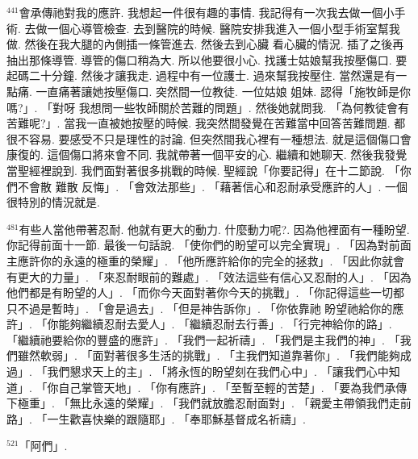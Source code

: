 \documentclass{book}
\begin{document}
$^{441}$會承傳祂對我的應許.
我想起一件很有趣的事情.
我記得有一次我去做一個小手術.
去做一個心導管檢查.
去到醫院的時候.
醫院安排我進入一個小型手術室幫我做.
然後在我大腿的內側插一條管進去.
然後去到心臟 看心臟的情況.
插了之後再抽出那條導管.
導管的傷口稍為大.
所以他要很小心.
找護士姑娘幫我按壓傷口.
要起碼二十分鐘.
然後才讓我走.
過程中有一位護士.
過來幫我按壓住.
當然還是有一點痛.
一直痛著讓她按壓傷口.
突然間一位教徒.
一位姑娘 姐妹.
認得「施牧師是你嗎?」.
「對呀 我想問一些牧師關於苦難的問題」.
然後她就問我.
「為何教徒會有苦難呢?」.
當我一直被她按壓的時候.
我突然間發覺在苦難當中回答苦難問題.
都很不容易.
要感受不只是理性的討論.
但突然間我心裡有一種想法.
就是這個傷口會康復的.
這個傷口將來會不同.
我就帶著一個平安的心.
繼續和她聊天.
然後我發覺當聖經裡說到.
我們面對著很多挑戰的時候.
聖經說「你要記得」在十二節說.
「你們不會散 難散 反悔」.
「會效法那些」.
「藉著信心和忍耐承受應許的人」.
一個很特別的情況就是.

$^{481}$有些人當他帶著忍耐.
他就有更大的動力.
什麼動力呢?.
因為他裡面有一種盼望.
你記得前面十一節.
最後一句話說.
「使你們的盼望可以完全實現」.
「因為對前面主應許你的永遠的極重的榮耀」.
「他所應許給你的完全的拯救」.
「因此你就會有更大的力量」.
「來忍耐眼前的難處」.
「效法這些有信心又忍耐的人」.
「因為他們都是有盼望的人」.
「而你今天面對著你今天的挑戰」.
「你記得這些一切都只不過是暫時」.
「會是過去」.
「但是神告訴你」.
「你依靠祂 盼望祂給你的應許」.
「你能夠繼續忍耐去愛人」.
「繼續忍耐去行善」.
「行完神給你的路」.
「繼續祂要給你的豐盛的應許」.
「我們一起祈禱」.
「我們是主我們的神」.
「我們雖然軟弱」.
「面對著很多生活的挑戰」.
「主我們知道靠著你」.
「我們能夠成過」.
「我們懇求天上的主」.
「將永恆的盼望刻在我們心中」.
「讓我們心中知道」.
「你自己掌管天地」.
「你有應許」.
「至暫至輕的苦楚」.
「要為我們承傳下極重」.
「無比永遠的榮耀」.
「我們就放膽忍耐面對」.
「親愛主帶領我們走前路」.
「一生歡喜快樂的跟隨耶」.
「奉耶穌基督成名祈禱」.

$^{521}$「阿們」.
\newpage
\end{document}
